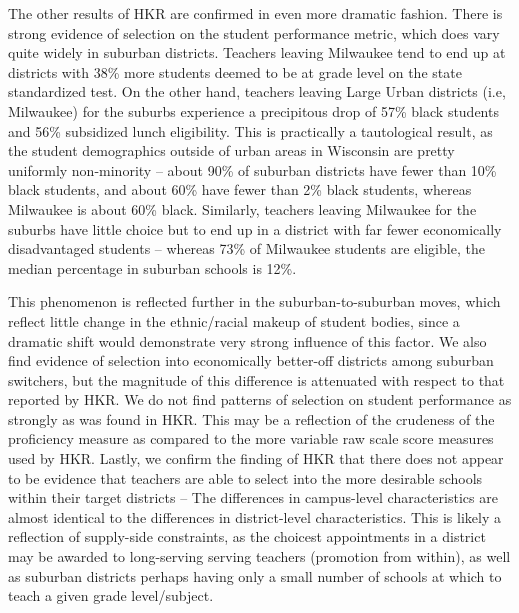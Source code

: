 The other results of HKR are confirmed in even more dramatic fashion.
There is strong evidence of selection on the student performance metric,
which does vary quite widely in suburban districts. Teachers leaving
Milwaukee tend to end up at districts with 38\% more students deemed to
be at grade level on the state standardized test. On the other hand,
teachers leaving Large Urban districts (i.e, Milwaukee) for the suburbs
experience a precipitous drop of 57\% black students and 56\% subsidized
lunch eligibility. This is practically a tautological result, as the
student demographics outside of urban areas in Wisconsin are pretty
uniformly non-minority -- about 90\% of suburban districts have fewer
than 10\% black students, and about 60\% have fewer than 2\% black
students, whereas Milwaukee is about 60\% black. Similarly, teachers
leaving Milwaukee for the suburbs have little choice but to end up in a
district with far fewer economically disadvantaged students -- whereas
73\% of Milwaukee students are eligible, the median percentage in
suburban schools is 12\%.

This phenomenon is reflected further in the suburban-to-suburban moves,
which reflect little change in the ethnic/racial makeup of student
bodies, since a dramatic shift would demonstrate very strong influence
of this factor. We also find evidence of selection into economically
better-off districts among suburban switchers, but the magnitude of this
difference is attenuated with respect to that reported by HKR. We do not
find patterns of selection on student performance as strongly as was
found in HKR. This may be a reflection of the crudeness of the
proficiency measure as compared to the more variable raw scale score
measures used by HKR. Lastly, we confirm the finding of HKR that there
does not appear to be evidence that teachers are able to select into the
more desirable schools within their target districts -- The differences
in campus-level characteristics are almost identical to the differences
in district-level characteristics. This is likely a reflection of
supply-side constraints, as the choicest appointments in a district may
be awarded to long-serving serving teachers (promotion from within), as
well as suburban districts perhaps having only a small number of schools
at which to teach a given grade level/subject.

